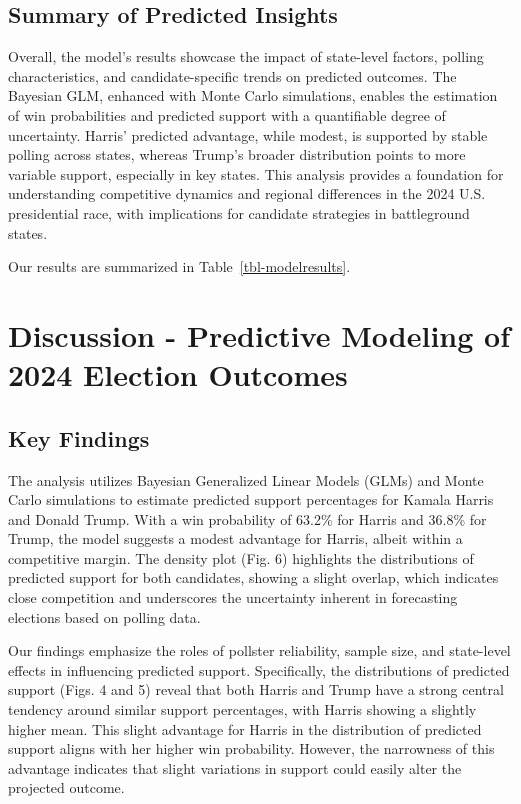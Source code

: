 \documentclass[
  letterpaper,
  DIV=11,
  numbers=noendperiod]{scrartcl}
\begin{document}
\subsection{Summary of Predicted
Insights}\label{summary-of-predicted-insights}

Overall, the model's results showcase the impact of state-level factors,
polling characteristics, and candidate-specific trends on predicted
outcomes. The Bayesian GLM, enhanced with Monte Carlo simulations,
enables the estimation of win probabilities and predicted support with a
quantifiable degree of uncertainty. Harris' predicted advantage, while
modest, is supported by stable polling across states, whereas Trump's
broader distribution points to more variable support, especially in key
states. This analysis provides a foundation for understanding
competitive dynamics and regional differences in the 2024 U.S.
presidential race, with implications for candidate strategies in
battleground states.

Our results are summarized in Table~\ref{tbl-modelresults}.

\section{Discussion - Predictive Modeling of 2024 Election
Outcomes}\label{discussion---predictive-modeling-of-2024-election-outcomes}

\subsection{Key Findings}\label{key-findings}

The analysis utilizes Bayesian Generalized Linear Models (GLMs) and
Monte Carlo simulations to estimate predicted support percentages for
Kamala Harris and Donald Trump. With a win probability of 63.2\% for
Harris and 36.8\% for Trump, the model suggests a modest advantage for
Harris, albeit within a competitive margin. The density plot (Fig. 6)
highlights the distributions of predicted support for both candidates,
showing a slight overlap, which indicates close competition and
underscores the uncertainty inherent in forecasting elections based on
polling data.

Our findings emphasize the roles of pollster reliability, sample size,
and state-level effects in influencing predicted support. Specifically,
the distributions of predicted support (Figs. 4 and 5) reveal that both
Harris and Trump have a strong central tendency around similar support
percentages, with Harris showing a slightly higher mean. This slight
advantage for Harris in the distribution of predicted support aligns
with her higher win probability. However, the narrowness of this
advantage indicates that slight variations in support could easily alter
the projected outcome.
\end{document}
